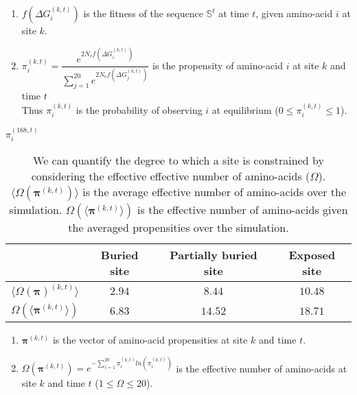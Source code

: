\documentclass[8pt]{beamer}
\begin{document}
	
	\begin{frame}
		\begin{enumerate}
			\item $ f(\Delta G_i^{(k,t)}) $  is the fitness of the sequence $\mathbb{S}^t$ at time $t$, given amino-acid $i$ at site $k$. \\
			\item $ \pi_i^{(k,t)} = \dfrac{ e^{2 N_\mathrm{e} f(\Delta G_i^{(k,t)})} }{ \sum_{j=1}^{20} e^{2 N_\mathrm{e} f(\Delta G_j^{(k,t)})} }$ is the propensity of amino-acid $i$ at site $k$ and time $t$\\Thus $ \pi_i^{(k,t)} $ is the probability of observing $i$ at equilibrium ($0 \leq \pi_i^{(k,t)} \leq 1$). \\
		\end{enumerate}
		$ \pi_i^{(168, t)}$
	\end{frame}

	\begin{frame}
		\begin{table}[ht]
			\centering
			\begin{adjustbox}{width = 1\textwidth}
				\begin{tabular}{|c|c|c|c|}
					\hline
				 & Buried site & Partially buried site & Exposed site \\
					\hline
				$ \langle \Omega( \boldsymbol{\pi})^{(k,t)} \rangle $ & $2.94$ & $8.44$ & $10.48$ \\
				\hline
				$ \Omega (\langle \boldsymbol{\pi}^{(k,t)} \rangle) $ & $6.83$ & $14.52$ & $18.71$ \\
					\hline
				\end{tabular}
			\end{adjustbox}
			\caption{We can quantify the degree to which a site is constrained by considering the effective effective number of amino-acids ($\Omega$). $ \langle \Omega( \boldsymbol{\pi}^{(k,t)}) \rangle $ is the average effective number of amino-acids over the simulation. $ \Omega (\langle \boldsymbol{\pi}^{(k,t)} \rangle) $ is the effective number of amino-acids given the averaged propensities over the simulation. }
		\end{table}
		\begin{enumerate}
			\item $ \boldsymbol{\pi}^{(k,t)} $ is the vector of  amino-acid propensities at site $k$ and time $t$. \\
			\item $ \Omega(\boldsymbol{\pi}^{(k,t)}) = e^{ - \sum_{i=1}^{20} \pi_i^{(k,t)} ln(\pi_i^{(k,t)}) } $ is the effective number of amino-acids at site $k$ and time $t$ ($1 \leq \Omega \leq 20$).
		\end{enumerate}
	
	\end{frame}
	
\end{document}
